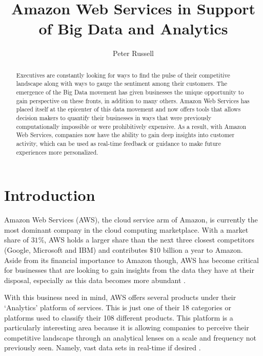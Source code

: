 \documentclass[sigconf]{acmart}
\begin{document}
\title{Amazon Web Services in Support of Big Data and Analytics}


\author{Peter Russell}

\begin{abstract}
Executives are constantly looking for ways to find the pulse of their competitive landscape along with ways to gauge the sentiment among their customers. The emergence of the Big Data movement has given businesses the unique opportunity to gain perspective on these fronts, in addition to many others. Amazon Web Services has placed itself at the epicenter of this data movement and now offers tools that allows decision makers to quantify their businesses in ways that were previously computationally impossible or were  prohibitively expensive. As a result, with Amazon Web Services, companies now have the ability to gain deep insights into customer activity, which can be used as real-time feedback or guidance to make future experiences more personalized.

\end{abstract}


\maketitle

\section{Introduction}

Amazon Web Services (AWS), the cloud service arm of Amazon, is currently the most dominant company in the cloud computing marketplace. With a market share of $31\%$, AWS holds a larger share than the next three closest competitors (Google, Microsoft and IBM) and contributes  $\$10$ billion a year to Amazon\cite{aws_mkt}. Aside from its financial importance to Amazon though, AWS has become critical for businesses that are looking to gain insights from the data they have at their disposal, especially as this data becomes more abundant \cite{economist}. 

With this business need in mind, AWS offers several products under their `Analytics' platform of services. This is just one of their 18 categories or platforms used to classify their 108 different products. This platform is a particularly interesting area because it is allowing companies to perceive their competitive landscape through an analytical lenses on a scale and frequency not previously seen. Namely, vast data sets in real-time if desired \cite{ge}. 
\end{document}
